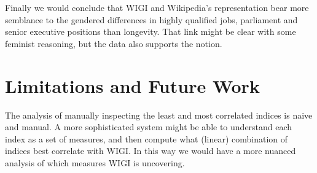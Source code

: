 \documentclass{sig-alternate}
\begin{document}
Finally we would conclude that WIGI and Wikipedia's representation bear more semblance to the gendered differences in highly qualified jobs, parliament and senior executive positions than longevity. That link might be clear with some feminist reasoning, but the data also supports the notion.

\section{Limitations and Future Work}
The analysis of manually inspecting the least and most correlated indices is naive and manual. A more sophisticated system might be able to understand each index as a set of measures, and then compute what (linear) combination of indices best correlate with WIGI. In this way we would have a more nuanced analysis of which measures WIGI is uncovering.

%

%
%
\end{document}
